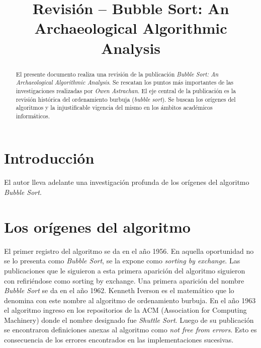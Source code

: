 \documentclass[conference]{IEEEtran}
\begin{document}
%
\title{Revisión -- Bubble Sort: An Archaeological Algorithmic Analysis}


\author{
}

\maketitle


\begin{abstract}
El presente documento realiza una revisión de la publicación
\emph{Bubble Sort: An Archaeological Algorithmic Analysis}. Se
rescatan los puntos más importantes de las investigaciones realizadas
por \emph{Owen Astrachan}. El eje central de la publicación es la
revisión histórica del ordenamiento burbuja (\emph{bubble
  sort}). Se buscan los orígenes del algoritmos y la injustificable
vigencia del mismo en los ámbitos académicos informáticos.
\end{abstract}

\IEEEpeerreviewmaketitle

\section{Introducción}
\label{sec:intro}

El autor lleva adelante una investigación profunda de los orígenes del
algoritmo \emph{Bubble Sort}. 

\section{Los orígenes del algoritmo}
\label{sec:origen-alg}

El primer registro del algoritmo se da en el año 1956. En aquella
oportunidad no se lo presenta como \emph{Bubble Sort}, se la expone
como \emph{sorting by exchange}. Las publicaciones que le siguieron a
esta primera aparición del algoritmo siguieron con refiriéndose como
sorting by exchange. 
Una primera aparición del nombre \emph{Bubble Sort} se da en el año
1962.  Kenneth Iverson es el matemático que lo denomina con este
nombre al algoritmo de ordenamiento burbuja.
En el año 1963 el algoritmo ingreso en los repositorios de la ACM
(Association for Computing Machinery) donde el nombre designado fue
\emph{Shuttle Sort}. Luego de su publicación se encontraron
definiciones anexas al algoritmo como \emph{not free from
  errors}. Esto es consecuencia de los errores encontrados en las
implementaciones sucesivas. 
\end{document}
